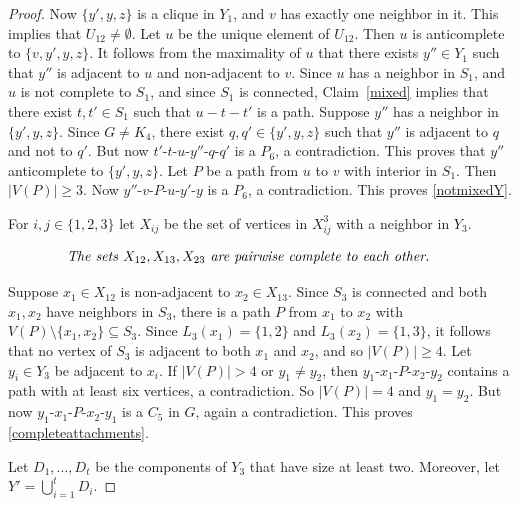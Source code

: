 \documentclass[11pt]{article}
\begin{document}
\begin{proof}
Now $\{y',y,z\}$ is a clique in $Y_1$, and $v$ has exactly one neighbor in it.
This implies that $U_{12} \neq \emptyset$. Let $u$ be the unique element
of $U_{12}$. Then $u$ is anticomplete to 
$\{v,y',y,z\}$. It follows from the maximality of $u$ that there exists
$y'' \in Y_1$ such that $y''$ is adjacent to $u$ and non-adjacent to $v$.
Since $u$ has a neighbor
in $S_1$, and $u$ is not complete to $S_1$, and since $S_1$ is connected,
Claim~\ref{mixed} implies that there exist $t,t' \in S_1$ such that 
$u-t-t'$ is  a path. 
Suppose $y''$ has a neighbor in $\{y',y,z\}$.
Since $G \neq K_4$, there exist $q,q' \in \{y',y,z\}$ such that
$y''$ is adjacent to $q$ and not to $q'$.
But now $t'$-$t$-$u$-$y''$-$q$-$q'$ is a $P_6$, a contradiction.
This proves that  $y''$  anticomplete to $\{y',y,z\}$.
Let $P$ be a path from $u$ to $v$ with interior in $S_1$.
Then $|V(P)| \geq 3$. Now $y''$-$v$-$P$-$u$-$y'$-$y$ is a $P_6$, a contradiction.
This proves \eqref{notmixedY}.

\bigskip
For $i,j \in \{1,2,3\}$ let $X_{ij}$ be the set of vertices in $X^3_{ij}$ with a neighbor in $Y_3$.

\begin{equation}
\label{completeattachments}
\begin{minipage}[c]{0.8 \textwidth} \em
The sets $X_{12},X_{13},X_{23}$ are pairwise complete to each other.
\end{minipage}
\end{equation}

Suppose $x_1 \in X_{12}$ is non-adjacent to $x_2 \in X_{13}$. Since $S_3$ is connected and both
$x_1,x_2$ have neighbors in $S_3$, there is a path $P$ from $x_1$ to $x_2$
with $V(P) \setminus \{x_1,x_2\} \subseteq S_3$.
Since $L_3(x_1)=\{1,2\}$ and $L_3(x_2)=\{1,3\}$, it follows that no vertex
of $S_3$ is adjacent to both $x_1$ and $x_2$, and so $|V(P)| \geq 4$.
Let $y_i \in Y_3$ be adjacent to $x_i$.
If $|V(P)|>4$ or $y_1 \neq y_2$, then $y_1$-$x_1$-$P$-$x_2$-$y_2$ contains a path
with at least six vertices, a contradiction. So
$|V(P)|=4$ and $y_1=y_2$. But now $y_1$-$x_1$-$P$-$x_2$-$y_1$ is a $C_5$ in $G$,
again a contradiction. This proves \eqref{completeattachments}.

\bigskip

Let $D_1, \ldots, D_t$ be the components of $Y_3$ that have size at least two.
Moreover, let $Y'=\bigcup_{i=1}^t D_i$.


\end{proof}
\end{document}
